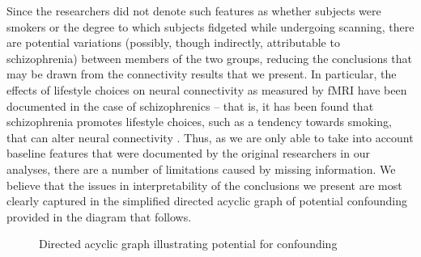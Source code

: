 \documentclass[11pt]{article}
\begin{document}
Since the researchers did not denote such features as whether subjects were smokers or the
degree to which subjects fidgeted while undergoing scanning, there are potential
variations (possibly, though indirectly, attributable to schizophrenia) between
members of the two groups, reducing the conclusions that may be drawn from the
connectivity results that we present. In particular, the effects of lifestyle
choices on neural connectivity as measured by fMRI have been documented in the
case of schizophrenics -- that is, it has been found that schizophrenia promotes
lifestyle choices, such as a tendency towards smoking, that can alter neural
connectivity \cite{leyba2008smoking}. Thus, as we are only able to take into 
account baseline features that were documented by the original researchers in 
our analyses, there are a number of limitations caused by missing information. 
We believe that the issues in interpretability of the conclusions we present 
are most clearly captured in the simplified directed acyclic graph of potential 
confounding provided in the diagram that follows. \\[5pt]

\begin{figure}[H]
\centering
{}
\caption{Directed acyclic graph illustrating potential for confounding}
\end{figure}


\end{document}
